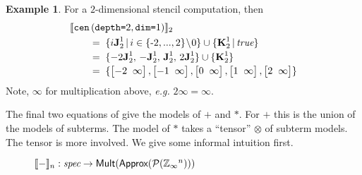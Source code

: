 \documentclass[10pt,preprint]{sigplanconf}
\newcounter{block}
\theoremstyle{definition}
\newtheorem{example}[block]{Example}
\newcommand{\eg}{\emph{e.g.}}
\newcommand{\interp}[1]{\llbracket{#1}\rrbracket}
\newcommand{\term}[1]{\texttt{#1}}
\newcommand{\stenCenS}[2]{\term{cen} \, (\term{depth=}#1,
  \term{dim=}#2)}
\newcommand{\vtwoh}[2]{\setlength{\arraycolsep}{0em}
\left[\begin{array}{cc}#1 \; & \; #2\end{array}\right]}
\newcommand{\singleEntry}[2]{\textbf{J}_{#2}^{#1}}
\newcommand{\zeroEntry}[2]{\textbf{K}_{#2}^{#1}}
\begin{document}
\begin{example}
For a $2$-dimensional stencil computation, then
\begin{align*}
& \interp{\stenCenS{2}{1}}_2 \\[-0.1em]
& \qquad = \; \{i\singleEntry{1}{2} \,|\, i \in \{\text{-}2,..., 2\}\!\setminus\!0 \}
  \cup  \{ \zeroEntry{1}{2} \,|\, \textit{true} \} \\[-0.2em]
& \qquad = \; \{-2\singleEntry{1}{2}, \, -\singleEntry{1}{2}, \,
  \singleEntry{1}{2}, \, 2\singleEntry{1}{2}\} \cup
  \{\zeroEntry{1}{2}\} \\[-0.2em]
& \qquad = \; \{\vtwoh{-2}{\infty}, \vtwoh{-1}{\infty}, \vtwoh{0}{\infty},
\vtwoh{1}{\infty}, \vtwoh{2}{\infty}\}
\end{align*}
Note, $\infty$ for multiplication above, \eg{} $2
 \infty = \infty$.
\end{example}
\noindent
The final two equations of  give the models
of $\term{+}$ and $\term{*}$. For $\term{+}$ this is the
 union of the models of subterms. The model of
$\term{*}$ takes a ``tensor'' $\otimes$ of subterm models. The tensor is
more involved. We give some informal intuition first.



%


%

\begin{figure}
\vspace{-1em}

\caption{%
$\interp{-}_n : \textit{spec} \rightarrow \textsf{Mult}(\textsf{Approx}(\mathcal{P}(\domainVal{}^n)))$}
\label{fig:spatial-model}
\vspace{-0.75em}
\end{figure}
\end{document}
